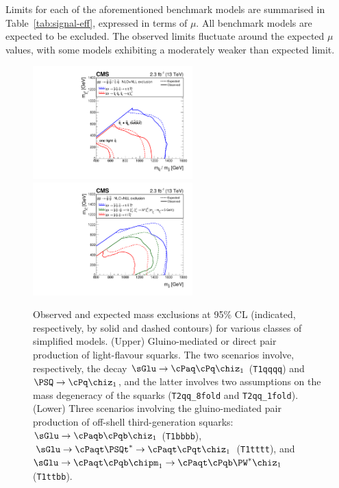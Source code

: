 Limits for each of the aforementioned benchmark models are summarised
in Table~\ref{tab:signal-eff}, expressed in terms of $\mu$. All
benchmark models are expected to be excluded. The observed limits
fluctuate around the expected $\mu$ values, with some models
exhibiting a moderately weaker than expected limit.

\begin{figure}[h!]
  \begin{center}
    \includegraphics[width=0.55\textwidth]{figures/limits/v3/mixSUMMARY.pdf}
    \includegraphics[width=0.55\textwidth]{figures/limits/v3/gluinoSUMMARY.pdf} 
    \caption{Observed and expected mass exclusions at 95\% CL
      (indicated, respectively, by solid and dashed contours) for
      various classes of simplified models. (Upper) Gluino-mediated or
      direct pair production of light-flavour squarks. The two
      scenarios involve, respectively, the decay
      $\sGlu\ra\cPaq\cPq\chiz_1$ (\texttt{T1qqqq}) and
      $\PSQ\ra\cPq\chiz_1$, and the latter involves two assumptions on
      the mass degeneracy of the squarks (\texttt{T2qq\_8fold} and
      \texttt{T2qq\_1fold}). (Lower) Three scenarios involving the
      gluino-mediated pair production of off-shell third-generation
      squarks: $\sGlu\ra\cPaqb\cPqb\chiz_1$ (\texttt{T1bbbb}),
      $\sGlu\ra\cPaqt\PSQt^*\ra\cPaqt\cPqt\chiz_1$ (\texttt{T1tttt}),
      and $\sGlu\ra\cPaqt\cPqb\chipm_1\ra\cPaqt\cPqb\PW^*\chiz_1$
      (\texttt{T1ttbb}).  }
    \label{fig:limits-sms-1} 
    \vspace{2.0cm} %
  \end{center}
\end{figure}

